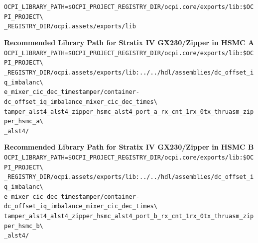 \noindent
\verb|OCPI_LIBRARY_PATH=$OCPI_PROJECT_REGISTRY_DIR/ocpi.core/exports/lib:$OCPI_PROJECT\| \\
\verb|_REGISTRY_DIR/ocpi.assets/exports/lib|
\par\medskip

\noindent\textbf{Recommended Library Path for Stratix IV GX230/Zipper in HSMC A}\\

\noindent
\verb|OCPI_LIBRARY_PATH=$OCPI_PROJECT_REGISTRY_DIR/ocpi.core/exports/lib:$OCPI_PROJECT\| \\
\verb|_REGISTRY_DIR/ocpi.assets/exports/lib:../../hdl/assemblies/dc_offset_iq_imbalanc\| \\
\verb|e_mixer_cic_dec_timestamper/container-dc_offset_iq_imbalance_mixer_cic_dec_times\| \\
\verb|tamper_alst4_alst4_zipper_hsmc_alst4_port_a_rx_cnt_1rx_0tx_thruasm_zipper_hsmc_a\| \\
\verb|_alst4/|
\par\medskip

\noindent\textbf{Recommended Library Path for Stratix IV GX230/Zipper in HSMC B}\\

\noindent
\verb|OCPI_LIBRARY_PATH=$OCPI_PROJECT_REGISTRY_DIR/ocpi.core/exports/lib:$OCPI_PROJECT\| \\
\verb|_REGISTRY_DIR/ocpi.assets/exports/lib:../../hdl/assemblies/dc_offset_iq_imbalanc\| \\
\verb|e_mixer_cic_dec_timestamper/container-dc_offset_iq_imbalance_mixer_cic_dec_times\| \\
\verb|tamper_alst4_alst4_zipper_hsmc_alst4_port_b_rx_cnt_1rx_0tx_thruasm_zipper_hsmc_b\| \\
\verb|_alst4/|
\par\medskip

